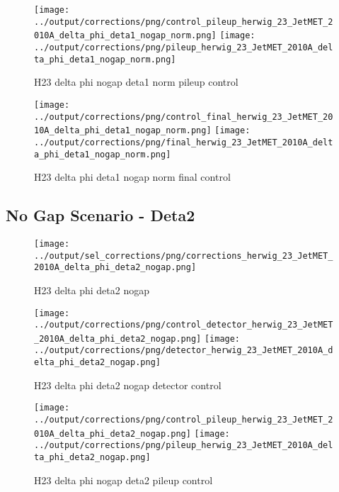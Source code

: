 \documentclass[11pt]{book}
\begin{document}
\begin{figure}[ht]
\centering
\texttt{[image: ../output/corrections/png/control\_pileup\_herwig\_23\_JetMET\_2010A\_delta\_phi\_deta1\_nogap\_norm.png]}
\texttt{[image: ../output/corrections/png/pileup\_herwig\_23\_JetMET\_2010A\_delta\_phi\_deta1\_nogap\_norm.png]}
\caption{H23 delta phi nogap deta1 norm pileup control}
\label{fig:H23_JetMET_2010A_delta_phi_deta1_nogap_norm_pileup_control}
\end{figure}


\begin{figure}[ht]
\centering
\texttt{[image: ../output/corrections/png/control\_final\_herwig\_23\_JetMET\_2010A\_delta\_phi\_deta1\_nogap\_norm.png]}
\texttt{[image: ../output/corrections/png/final\_herwig\_23\_JetMET\_2010A\_delta\_phi\_deta1\_nogap\_norm.png]}
\caption{H23 delta phi deta1 nogap norm final control}
\label{fig:H23_JetMET_2010A_delta_phi_deta1_nogap_norm_final_control}
\end{figure}


\clearpage
\subsection{No Gap Scenario - Deta2}
\begin{figure}[ht]
\centering
\texttt{[image: ../output/sel\_corrections/png/corrections\_herwig\_23\_JetMET\_2010A\_delta\_phi\_deta2\_nogap.png]}
\caption{H23 delta phi deta2 nogap}
\label{fig:H23_JetMET_2010A_delta_phi_deta2_nogap}
\end{figure}

\begin{figure}[ht]
\centering
\texttt{[image: ../output/corrections/png/control\_detector\_herwig\_23\_JetMET\_2010A\_delta\_phi\_deta2\_nogap.png]}
\texttt{[image: ../output/corrections/png/detector\_herwig\_23\_JetMET\_2010A\_delta\_phi\_deta2\_nogap.png]}
\caption{H23 delta phi deta2 nogap detector control}
\label{fig:H23_JetMET_2010A_delta_phi_deta2_nogap_detector_control}
\end{figure}

\begin{figure}[ht]
\centering
\texttt{[image: ../output/corrections/png/control\_pileup\_herwig\_23\_JetMET\_2010A\_delta\_phi\_deta2\_nogap.png]}
\texttt{[image: ../output/corrections/png/pileup\_herwig\_23\_JetMET\_2010A\_delta\_phi\_deta2\_nogap.png]}
\caption{H23 delta phi nogap deta2 pileup control}
\label{fig:H23_JetMET_2010A_delta_phi_deta2_nogap_pileup_control}
\end{figure}
\end{document}
